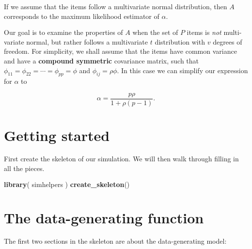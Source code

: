 \documentclass[
]{book}
\newenvironment{Shaded}{\begin{snugshade}}{\end{snugshade}}
\newcommand{\FunctionTok}[1]{\textcolor[rgb]{0.13,0.29,0.53}{\textbf{#1}}}
\newcommand{\NormalTok}[1]{#1}
\begin{document}
If we assume that the items follow a multivariate normal distribution, then \(A\) corresponds to the maximum likelihood estimator of \(\alpha\).

Our goal is to examine the properties of \(A\) when the set of \(P\) items is \emph{not} multi-variate normal, but rather follows a multivariate \(t\) distribution with \(v\) degrees of freedom.
For simplicity, we shall assume that the items have common variance and have a \textbf{compound symmetric} covariance matrix, such that \(\phi_{11} = \phi_{22} = \cdots = \phi_{pp} = \phi\) and \(\phi_{ij} = \rho \phi\). In this case we can simplify our expression for \(\alpha\) to

\[
\alpha = \frac{p \rho}{1 + \rho (p - 1)}.
\]

\section{Getting started}\label{getting-started}

First create the skeleton of our simulation.
We will then walk through filling in all the pieces.

\begin{Shaded}
\begin{Highlighting}[]
\FunctionTok{library}\NormalTok{( simhelpers )}
\FunctionTok{create\_skeleton}\NormalTok{()}
\end{Highlighting}
\end{Shaded}

\section{The data-generating function}\label{the-data-generating-function}

The first two sections in the skeleton are about the data-generating model:
\end{document}
